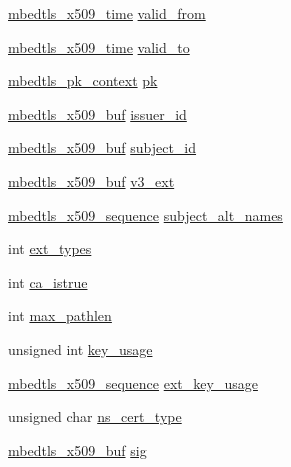 \begin{DoxyCompactItemize}
\item 
\hyperlink{structmbedtls__x509__time}{mbedtls\-\_\-x509\-\_\-time} \hyperlink{structmbedtls__x509__crt_aad3cad5d228545a1950850239741784f}{valid\-\_\-from}
\item 
\hyperlink{structmbedtls__x509__time}{mbedtls\-\_\-x509\-\_\-time} \hyperlink{structmbedtls__x509__crt_a05af94003d5948703ca537b6a5f2d5b4}{valid\-\_\-to}
\item 
\hyperlink{structmbedtls__pk__context}{mbedtls\-\_\-pk\-\_\-context} \hyperlink{structmbedtls__x509__crt_a64f66291338e6b230542d83035fe5f20}{pk}
\item 
\hyperlink{group__x509__module_ga4d02c9e8e4e2934555e0d132cd2976dc}{mbedtls\-\_\-x509\-\_\-buf} \hyperlink{structmbedtls__x509__crt_a6bb2a7142b718fa43b948770ccc98dcd}{issuer\-\_\-id}
\item 
\hyperlink{group__x509__module_ga4d02c9e8e4e2934555e0d132cd2976dc}{mbedtls\-\_\-x509\-\_\-buf} \hyperlink{structmbedtls__x509__crt_adbbaba207a103a73f41b4b72ffc540f5}{subject\-\_\-id}
\item 
\hyperlink{group__x509__module_ga4d02c9e8e4e2934555e0d132cd2976dc}{mbedtls\-\_\-x509\-\_\-buf} \hyperlink{structmbedtls__x509__crt_a6baebf9741097506a60521fbcaf5996b}{v3\-\_\-ext}
\item 
\hyperlink{group__x509__module_gabd52d60a09315854d9ef849d02154f35}{mbedtls\-\_\-x509\-\_\-sequence} \hyperlink{structmbedtls__x509__crt_a1f148e8fb52e03e2604e716386a07df4}{subject\-\_\-alt\-\_\-names}
\item 
int \hyperlink{structmbedtls__x509__crt_a60878e1cb7a3058f19042d8f189158b0}{ext\-\_\-types}
\item 
int \hyperlink{structmbedtls__x509__crt_a196b3a43dae5a1c0058f46075f832890}{ca\-\_\-istrue}
\item 
int \hyperlink{structmbedtls__x509__crt_ab0af43652f426ace28052ec47fdde6fb}{max\-\_\-pathlen}
\item 
unsigned int \hyperlink{structmbedtls__x509__crt_a3b7650600aa6e637b8ab534a938aee94}{key\-\_\-usage}
\item 
\hyperlink{group__x509__module_gabd52d60a09315854d9ef849d02154f35}{mbedtls\-\_\-x509\-\_\-sequence} \hyperlink{structmbedtls__x509__crt_ac94f7360a7143ce1b983fab46c34dcf2}{ext\-\_\-key\-\_\-usage}
\item 
unsigned char \hyperlink{structmbedtls__x509__crt_adc36c60aa279fae8bd35a20b9c2bba22}{ns\-\_\-cert\-\_\-type}
\item 
\hyperlink{group__x509__module_ga4d02c9e8e4e2934555e0d132cd2976dc}{mbedtls\-\_\-x509\-\_\-buf} \hyperlink{structmbedtls__x509__crt_aea76ebaa8c8e23129bd905cdc0242a3a}{sig}

\end{DoxyCompactItemize}
